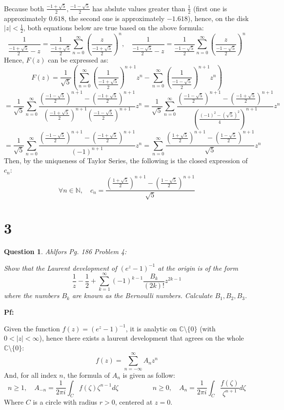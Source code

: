 \documentclass{article}
\newtheorem{question}{Question}
\begin{document}
Because both $\frac{-1+\sqrt{5}}{2},\frac{-1-\sqrt{5}}{2}$ has abslute values greater than $\frac{1}{2}$ (first one is approximately $0.618$, the second one is approximately $-1.618$),
hence, on the disk $|z|<\frac{1}{2}$, both equations below are true based on the above formula:
$$\frac{1}{\frac{-1+\sqrt{5}}{2}-z}=\frac{1}{\frac{-1+\sqrt{5}}{2}}\sum_{n=0}^{\infty}\left(\frac{z}{\frac{-1+\sqrt{5}}{2}}\right)^n,\quad \frac{1}{\frac{-1-\sqrt{5}}{2}-z}=\frac{1}{\frac{-1-\sqrt{5}}{2}}\sum_{n=0}^{\infty}\left(\frac{z}{\frac{-1-\sqrt{5}}{2}}\right)^n$$
Hence, $F(z)$ can be expressed as:
$$F(z)=\frac{1}{\sqrt{5}}\left(\sum_{n=0}^{\infty}\left(\frac{1}{\frac{-1+\sqrt{5}}{2}}\right)^{n+1}z^n-\sum_{n=0}^{\infty}\left(\frac{1}{\frac{-1-\sqrt{5}}{2}}\right)^{n+1}z^n\right)$$
$$=\frac{1}{\sqrt{5}}\sum_{n=0}^{\infty}\frac{\left(\frac{-1-\sqrt{5}}{2}\right)^{n+1}-\left(\frac{-1+\sqrt{5}}{2}\right)^{n+1}}{\left(\frac{-1+\sqrt{5}}{2}\right)^{n+1}\left(\frac{-1-\sqrt{5}}{2}\right)^{n+1}}z^n =\frac{1}{\sqrt{5}}\sum_{n=0}^{\infty}\frac{\left(\frac{-1-\sqrt{5}}{2}\right)^{n+1}-\left(\frac{-1+\sqrt{5}}{2}\right)^{n+1}}{\left(\frac{(-1)^2-(\sqrt{5})^2}{4}\right)^{n+1}}z^n$$
$$=\frac{1}{\sqrt{5}}\sum_{n=0}^{\infty}\frac{\left(\frac{-1-\sqrt{5}}{2}\right)^{n+1}-\left(\frac{-1+\sqrt{5}}{2}\right)^{n+1}}{(-1)^{n+1}}z^n = \sum_{n=0}^{\infty}\frac{\left(\frac{1+\sqrt{5}}{2}\right)^{n+1}-\left(\frac{1-\sqrt{5}}{2}\right)^{n+1}}{\sqrt{5}}z^n$$
Then, by the uniqueness of Taylor Series, the following is the closed expression of $c_n$:
$$\forall n\in\mathbb{N},\quad c_n=\frac{\left(\frac{1+\sqrt{5}}{2}\right)^{n+1}-\left(\frac{1-\sqrt{5}}{2}\right)^{n+1}}{\sqrt{5}}$$

\break

\section*{3}
\begin{myBox}[]{}
    \begin{question}
        Ahlfors Pg. 186 Problem 4:

        Show that the Laurent development of $(e^z-1)^{-1}$ at the origin is of the form
        $$\frac{1}{z}-\frac{1}{2}+\sum_{k=1}^{\infty}(-1)^{k-1}\frac{B_k}{(2k)!}z^{2k-1}$$
        where the numbers $B_k$ are known as the Bernoulli numbers. Calculate $B_1,B_2,B_3$.
    \end{question}
\end{myBox}

\textbf{Pf:}

Given the function $f(z)=(e^z-1)^{-1}$, it is analytic on $\mathbb{C}\setminus\{0\}$ (with $0<|z|<\infty$), hence there exists a laurent development that agrees on the whole $\mathbb{C}\setminus\{0\}$:
$$f(z)=\sum_{n=-\infty}^{\infty}A_nz^n$$
And, for all index $n$, the formula of $A_n$ is given as follow:
$$n\geq 1,\quad A_{-n}=\frac{1}{2\pi i}\int_{C}f(\zeta)\zeta^{n-1}d\zeta\quad \quad \quad \quad \quad n\geq 0,\quad A_n=\frac{1}{2\pi i}\int_{C}\frac{f(\zeta)}{\zeta^{n+1}}d\zeta$$
Where $C$ is a circle with radius $r>0$, centered at $z=0$.
\end{document}
